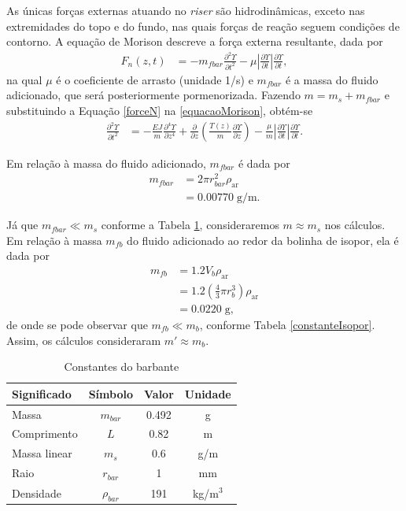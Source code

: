 As únicas forças externas atuando no \textit{riser} são hidrodinâmicas, exceto nas extremidades do topo e do fundo, nas quais forças de reação seguem condições de contorno. A equação de Morison descreve a força externa resultante, dada por \begin{align}
	F_n(z,t) &= -m_{fbar} \frac{\partial^2 \Upsilon}{\partial t^2} - \mu \left|\frac{\partial \Upsilon}{\partial t}\right|\frac{\partial \Upsilon}{\partial t}\label{forceN},
\end{align} na qual $\mu$ é o coeficiente de arrasto (unidade 1/s) e $m_{fbar}$ é a massa do fluido adicionado, que será posteriormente pormenorizada. Fazendo $m = m_s + m_{fbar}$ e substituindo a Equação \ref{forceN} na \ref{equacaoMorison}, obtém-se \begin{align}
	\frac{\partial^2 \Upsilon}{\partial t^2} &= -\frac{EJ}{m}\frac{\partial^4 \Upsilon}{\partial z^4} + \frac{\partial}{\partial z}\left(\frac{T(z)}{m}\frac{\partial \Upsilon}{\partial z}\right) - \frac{\mu}{m}\left|\frac{\partial \Upsilon}{\partial t}\right|\frac{\partial \Upsilon}{\partial t}.
\end{align}

Em relação à massa do fluido adicionado, $m_{fbar}$ é dada por \begin{align}
	m_{fbar} &=  2 \pi r_{bar}^2 \rho_{\mathrm{ar}}\nonumber\\
	&= 0.00770\;\mathrm{g/m}.
\end{align} 

 Já que $m_{fbar} \ll m_s$ conforme a Tabela \ref{constanteBarbante}, consideraremos $m \approx m_s$ nos cálculos. Em relação à massa $m_{fb}$ do fluido adicionado ao redor da bolinha de isopor, ela é dada por\begin{align}
	m_{fb} &= 1.2 V_{b} \rho_{\mathrm{ar}}\nonumber\\
	&= 1.2 \left(\frac{4}{3}\pi r_b^3\right)\rho_{\mathrm{ar}}\nonumber\\
	&= 0.0220\;\textrm{g},
\end{align} de onde se pode observar que $m_{fb} \ll m_{b}$, conforme Tabela \ref{constanteIsopor}. Assim,  os cálculos consideraram $m' \approx m_b$.

\begin{table}[!ht]
	\centering
	\caption{Constantes do barbante\label{constanteBarbante}}
	\begin{tabular}{|l|c|c|c|}
		\hline
		\textbf{Significado} & \textbf{Símbolo} & \textbf{Valor} & \textbf{Unidade}\\ \hline \hline
		Massa & $m_{bar}$ & 0.492 & g\\ \hline
		Comprimento & $L$ & 0.82 & m \\ \hline
		Massa linear & $m_s$ & 0.6 & g/m\\ \hline
		Raio & $r_{bar}$ & 1 & mm\\ \hline
		Densidade & $\rho_{bar}$ & 191 & kg/m$^3$\\ \hline
	\end{tabular}
	
\end{table}

